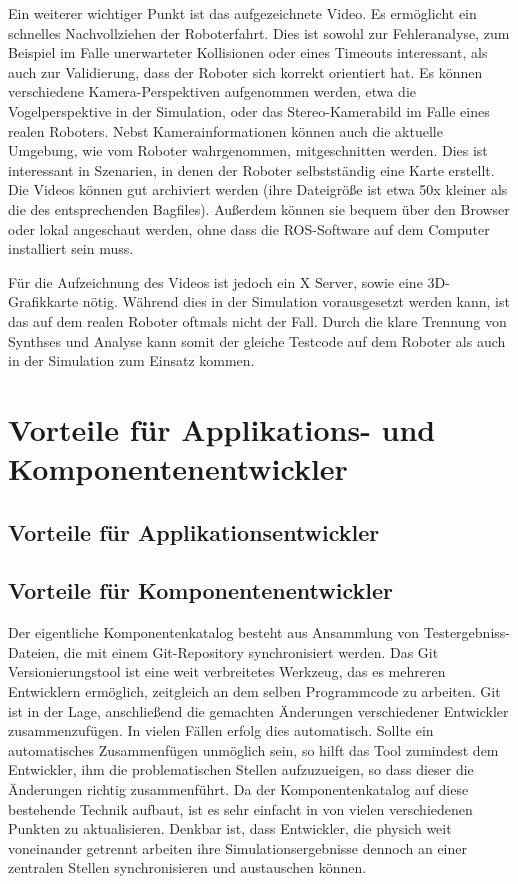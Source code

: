 Ein weiterer wichtiger Punkt ist das aufgezeichnete Video. Es ermöglicht ein schnelles Nachvollziehen der Roboterfahrt. Dies ist sowohl zur Fehleranalyse, zum Beispiel im Falle unerwarteter Kollisionen oder eines Timeouts interessant, als auch zur Validierung, dass der Roboter sich korrekt orientiert hat. Es können verschiedene Kamera-Perspektiven aufgenommen werden, etwa die Vogelperspektive in der Simulation, oder das Stereo-Kamerabild im Falle eines realen Roboters. Nebst Kamerainformationen können auch die aktuelle Umgebung, wie vom Roboter wahrgenommen, mitgeschnitten werden. Dies ist interessant in Szenarien, in denen der Roboter selbstständig eine Karte erstellt. 
Die Videos können gut archiviert werden (ihre Dateigröße ist etwa 50x kleiner als die des entsprechenden Bagfiles). Außerdem können sie bequem über den Browser oder lokal angeschaut werden, ohne dass die ROS-Software auf dem Computer installiert sein muss. 

Für die Aufzeichnung des Videos ist jedoch ein X Server, sowie eine 3D-Grafikkarte nötig. Während dies in der Simulation vorausgesetzt werden kann, ist das auf dem realen Roboter oftmals nicht der Fall.  Durch die klare Trennung von Synthses und Analyse kann somit der gleiche Testcode auf dem Roboter als auch in der Simulation zum Einsatz kommen.


\section{Vorteile für Applikations- und Komponentenentwickler}
\subsection{Vorteile für Applikationsentwickler}
\subsection{Vorteile für Komponentenentwickler}
Der eigentliche Komponentenkatalog besteht aus Ansammlung von Testergebniss-Dateien, die mit einem Git-Repository synchronisiert werden. Das Git Versionierungstool ist eine weit verbreitetes Werkzeug, das es mehreren Entwicklern ermöglich, zeitgleich an dem selben Programmcode zu arbeiten. Git ist in der Lage, anschließend die gemachten Änderungen verschiedener Entwickler zusammenzufügen. In vielen Fällen erfolg dies automatisch. Sollte ein automatisches Zusammenfügen unmöglich sein, so hilft das Tool zumindest dem Entwickler, ihm die problematischen Stellen aufzuzueigen, so dass dieser die Änderungen richtig zusammenführt.
Da der Komponentenkatalog auf diese bestehende Technik aufbaut, ist es sehr einfacht in von vielen verschiedenen Punkten zu aktualisieren. Denkbar ist, dass Entwickler, die physich weit voneinander getrennt arbeiten ihre Simulationsergebnisse dennoch an einer zentralen Stellen synchronisieren und austauschen können.

